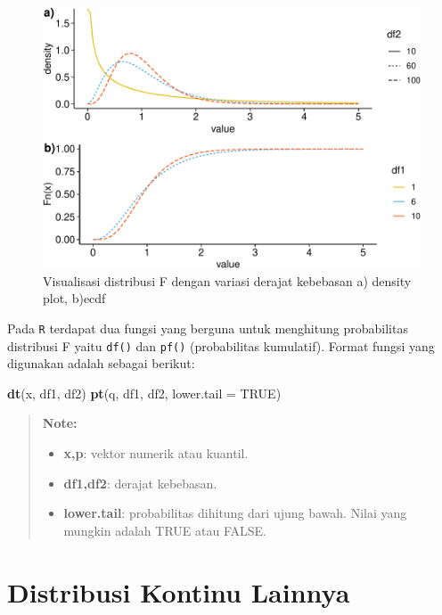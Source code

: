 \documentclass[]{book}
\newenvironment{Shaded}{\begin{snugshade}}{\end{snugshade}}
\newcommand{\KeywordTok}[1]{\textcolor[rgb]{0.13,0.29,0.53}{\textbf{#1}}}
\newcommand{\DataTypeTok}[1]{\textcolor[rgb]{0.13,0.29,0.53}{#1}}
\newcommand{\OtherTok}[1]{\textcolor[rgb]{0.56,0.35,0.01}{#1}}
\newcommand{\NormalTok}[1]{#1}
\providecommand{\tightlist}{%
  \setlength{\itemsep}{0pt}\setlength{\parskip}{0pt}}
\begin{document}
\begin{figure}

{\centering \includegraphics[width=0.9\linewidth]{EnvStat_files/figure-latex/dFvis-1} 

}

\caption{Visualisasi distribusi F dengan variasi derajat kebebasan a) density plot, b)ecdf}\label{fig:dFvis}
\end{figure}

Pada \texttt{R} terdapat dua fungsi yang berguna untuk menghitung
probabilitas distribusi F yaitu \texttt{df()} dan \texttt{pf()}
(probabilitas kumulatif). Format fungsi yang digunakan adalah sebagai
berikut:

\begin{Shaded}
\begin{Highlighting}[]
\KeywordTok{dt}\NormalTok{(x, df1, df2)}
\KeywordTok{pt}\NormalTok{(q, df1, df2, }\DataTypeTok{lower.tail =} \OtherTok{TRUE}\NormalTok{)}
\end{Highlighting}
\end{Shaded}

\begin{quote}
\textbf{Note: }

\begin{itemize}
\tightlist
\item
  \textbf{x,p}: vektor numerik atau kuantil.
\item
  \textbf{df1,df2}: derajat kebebasan.
\item
  \textbf{lower.tail}: probabilitas dihitung dari ujung bawah. Nilai
  yang mungkin adalah TRUE atau FALSE.
\end{itemize}
\end{quote}

\section{Distribusi Kontinu Lainnya}\label{distribusi-kontinu-lainnya}
\end{document}

